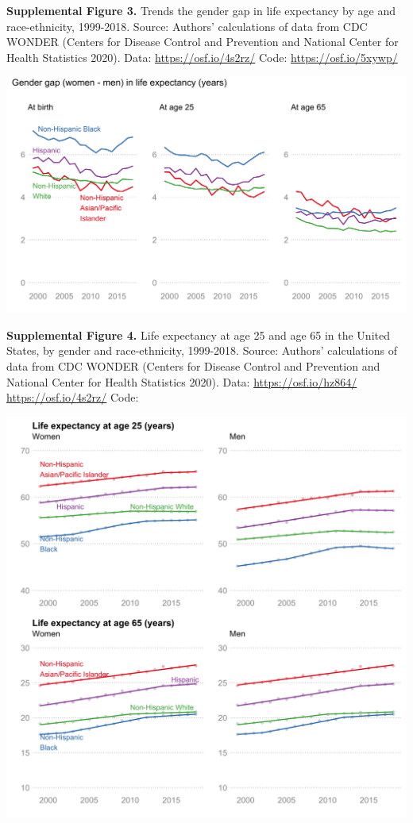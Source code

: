 \documentclass[
  11pt,
]{article}
\begin{document}
\newpage

\textbf{Supplemental Figure 3.} Trends the gender gap in life expectancy
by age and race-ethnicity, 1999-2018. Source: Authors' calculations of
data from CDC WONDER (Centers for Disease Control and Prevention and
National Center for Health Statistics 2020). Data:
\url{https://osf.io/4s2rz/} Code: \url{https://osf.io/5xywp/}

\includegraphics[width=1\linewidth]{../figures/le-gender-gap}

\newpage

\textbf{Supplemental Figure 4.} Life expectancy at age 25 and age 65 in
the United States, by gender and race-ethnicity, 1999-2018. Source:
Authors' calculations of data from CDC WONDER (Centers for Disease
Control and Prevention and National Center for Health Statistics 2020).
Data: \url{https://osf.io/hz864/} \url{https://osf.io/4s2rz/} Code:

\includegraphics[width=1\linewidth]{../figures/le-jp2565}
\end{document}
